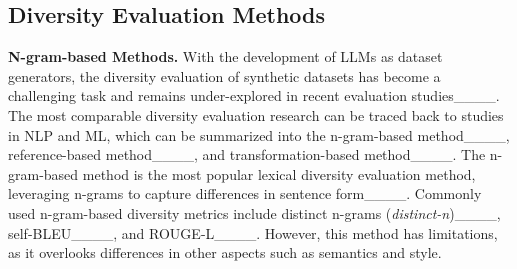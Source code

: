 



\subsection{Diversity Evaluation Methods}
\textbf{N-gram-based Methods.} With the development of LLMs as dataset generators, the diversity evaluation of synthetic datasets has become a challenging task and remains under-explored in recent evaluation studies____. The most comparable diversity evaluation research can be traced back to studies in NLP and ML, which can be summarized into the n-gram-based method____, reference-based method____, and transformation-based method____. The n-gram-based method is the most popular lexical diversity evaluation method, leveraging n-grams to capture differences in sentence form____. Commonly used n-gram-based diversity metrics include distinct n-grams (\textit{distinct-n})____, self-BLEU____, and ROUGE-L____. However, this method has limitations, as it overlooks differences in other aspects such as semantics and style.

